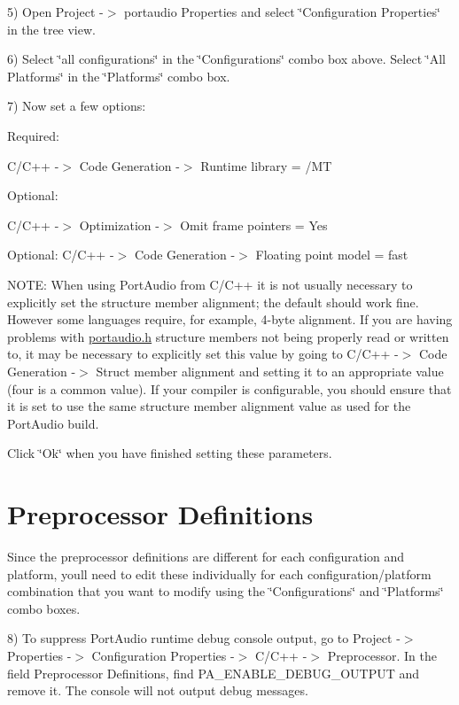 5) Open Project -\/$>$ portaudio Properties and select \char`\"{}\+Configuration Properties\char`\"{} in the tree view.

6) Select \char`\"{}all configurations\char`\"{} in the \char`\"{}\+Configurations\char`\"{} combo box above. Select \char`\"{}\+All Platforms\char`\"{} in the \char`\"{}\+Platforms\char`\"{} combo box.

7) Now set a few options\+:

Required\+:

C/\+C++ -\/$>$ Code Generation -\/$>$ Runtime library = /\+MT

Optional\+:

C/\+C++ -\/$>$ Optimization -\/$>$ Omit frame pointers = Yes

Optional\+: C/\+C++ -\/$>$ Code Generation -\/$>$ Floating point model = fast

N\+O\+TE\+: When using Port\+Audio from C/\+C++ it is not usually necessary to explicitly set the structure member alignment; the default should work fine. However some languages require, for example, 4-\/byte alignment. If you are having problems with \hyperlink{portaudio_8h}{portaudio.\+h} structure members not being properly read or written to, it may be necessary to explicitly set this value by going to C/\+C++ -\/$>$ Code Generation -\/$>$ Struct member alignment and setting it to an appropriate value (four is a common value). If your compiler is configurable, you should ensure that it is set to use the same structure member alignment value as used for the Port\+Audio build.

Click \char`\"{}\+Ok\char`\"{} when you have finished setting these parameters.\hypertarget{compile_windows_comp_win2}{}\section{Preprocessor Definitions}\label{compile_windows_comp_win2}
Since the preprocessor definitions are different for each configuration and platform, you\textquotesingle{}ll need to edit these individually for each configuration/platform combination that you want to modify using the \char`\"{}\+Configurations\char`\"{} and \char`\"{}\+Platforms\char`\"{} combo boxes.

8) To suppress Port\+Audio runtime debug console output, go to Project -\/$>$ Properties -\/$>$ Configuration Properties -\/$>$ C/\+C++ -\/$>$ Preprocessor. In the field \textquotesingle{}Preprocessor Definitions\textquotesingle{}, find P\+A\+\_\+\+E\+N\+A\+B\+L\+E\+\_\+\+D\+E\+B\+U\+G\+\_\+\+O\+U\+T\+P\+UT and remove it. The console will not output debug messages.

